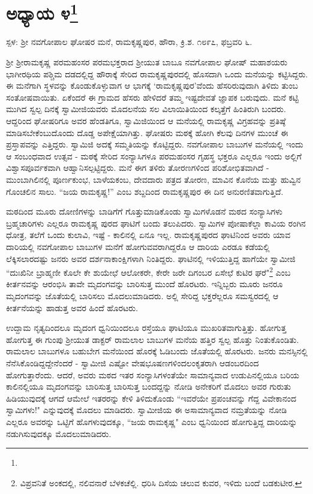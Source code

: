 \newpage

\chapter[ಅಧ್ಯಾಯ ೪]{ಅಧ್ಯಾಯ ೪\protect\footnote{}}

\begin{center}
ಸ್ಪಳ: ಶ‍್ರೀ ನವಗೋಪಾಲ ಘೋಷರ ಮನೆ, ರಾಮಕೃಷ್ಣಪುರ, ಹೌರಾ, ಕ್ರಿ.ಶ. ೧೮೯೭, ಫಬ್ರವರಿ ೬.
\end{center}

ಶ‍್ರೀ ಶ‍್ರೀರಾಮಕೃಷ್ಣ ಪರಮಹಂಸರ ಪರಮಭಕ್ತರಾದ ಶ‍್ರೀಯುತ ಬಾಬೂ ನವಗೋಪಾಲ ಘೋಷ್ ಮಹಾಶಯರು ಭಾಗೀರಥಿಯ ಪಶ್ಚಿಮ ದಡದಲ್ಲಿದ್ದ ಹೌರಾಕ್ಕೆ ಸೇರಿದ ರಾಮಕೃಷ್ಣಪುರದಲ್ಲಿ ಹೊಸದಾಗಿ ಒಂದು ಮನೆಯನ್ನು ಕಟ್ಟಿಸಿದ್ದರು. ಈ ಮನೆಗಾಗಿ ಸ್ಥಳವನ್ನು ಕೊಂಡುಕೊಳ್ಳುವಾಗ ಆ ಭಾಗಕ್ಕೆ ‘ರಾಮಕೃಷ್ಣಪುರ’ವೆಂದು ಹೆಸರಿರುವುದಾಗಿ ತಿಳಿದು ತುಂಬ ಸಂತೋಷವಾಯಿತು. ಏಕೆಂದರೆ ಈ ಗ್ರಾಮದ ಹೆಸರು ಹೇಳಿದರೆ ತಮ್ಮ ಇಷ್ಟದೇವತೆ ಜ್ಞಾಪಕ ಬರುವುದು. ಮನೆ ಕಟ್ಟಿ ಮುಗಿದ ಸ್ವಲ್ಪ ದಿನಕ್ಕೆ ಸ್ವಾಮೀಜಿಯವರು ಮೊದಲನೆಯ ಸಲ ವಿಲಾಯಿತಿಯಿಂದ ಕಲ್ಕತ್ತೆಗೆ ಹಿಂತಿರುಗಿ ಬಂದರು. ಆದ್ದರಿಂದ ಘೋಷರಿಗೂ ಅವರ ಹೆಂಡತಿಗೂ, ಸ್ವಾಮಿಜಿಯಿಂದ ಆ ಮನೆಯಲ್ಲಿ ರಾಮಕೃಷ್ಣ ವಿಗ್ರಹವನ್ನು ಪ್ರತಿಷ್ಠೆ ಮಾಡಿಸಬೇಕೆಂಬುದೊಂದು ದೊಡ್ಡ ಅಪೇಕ್ಷೆಯಾಗಿತ್ತು. ಘೋಷರು ಮಠಕ್ಕೆ ಹೋಗಿ ಕೆಲವು ದಿನಗಳ ಮುಂಚೆ ಈ ಪ್ರಸ್ತಾಪವನ್ನು ಎತ್ತಿದ್ದರು. ಸ್ವಾಮಿಜಿ ಅದಕ್ಕೆ ಸಮ್ಮತಿಯನ್ನು ಕೊಟ್ಟಿದ್ದರು. ನವಗೋಪಾಲ ಬಾಬುಗಳ ಮನೆಯಲ್ಲಿ ಇಂದು ಆ ಸಂಬಂಧವಾದ ಉತ್ಸವ - ಮಠಕ್ಕೆ ಸೇರಿದ ಸಂನ್ಯಾಸಿಗಳೂ ಪರಮಹಂಸರ ಗೃಹಸ್ಥ ಭಕ್ತರೂ ಎಲ್ಲರೂ ಇಂದು ಅಲ್ಲಿಗೆ ವಿಶ್ವಾಸಪೂರ್ವಕವಾಗಿ ಆಹ್ವಾನಿಸಲ್ಪಟ್ಟಿದ್ದರು. ಮನೆ ಈಗ ತಳಿರು ತೋರಣಗಳಿಂದ ಪರಿಶೋಭಿತವಾಗಿದೆ - ಮುಂಬಾಗಿಲಿನಲ್ಲಿ ಪೂರ್ಣಕುಂಭ, ಬಾಳೆಯಕಂಬ, ದೇವದಾರು ಪತ್ರದ ತೋರಣ, ಮಾವಿನ ಕೊನೆಯ ಮತ್ತು ಹುವ್ವಿನ ಗೊಂಚಲಿನ ಸಾಲು. “ಜಯ ರಾಮಕೃಷ್ಣ!” ಎಂಬ ಶಬ್ದದಿಂದ ರಾಮಕೃಷ್ಣಪುರ ಈ ದಿನ ಅನುರಣಿತವಾಗುತ್ತಿದೆ.

ಮಠದಿಂದ ಮೂರು ದೋಣಿಗಳನ್ನು ಬಾಡಿಗೆಗೆ ಗೊತ್ತುಮಾಡಿಕೊಂಡು ಸ್ವಾಮಿಗಳೊಡನೆ ಮಠದ ಸಂನ್ಯಾಸಿಗಳು ಬ್ರಹ್ಮಚಾರಿಗಳು ಎಲ್ಲರೂ ರಾಮಕೃಷ್ಣ ಪುರದ ಘಾಟಿಗೆ ಬಂದು ತಲುಪಿದರು. ಸ್ವಾಮಿಗಳ ಪೋಷಾಕೆಲ್ಲಾ ಕಾವಿಯ ರಂಗಿನ ಧೋತ್ರ, ತಲೆಗೆ ಒಂದು ಕುಲಾವಿ, ಇಷ್ಟೆ - ಕಾಲಿನಲ್ಲಿ ಏನೂ ಇಲ್ಲ. ರಾಮಕೃಷ್ಣಪುರದ ಘಾಟಿನಿಂದ ಅವರು ಯಾವ ದಾರಿಯಲ್ಲಿ ನವಗೋಪಾಲ ಬಾಬುಗಳ ಮನೆಗೆ ಹೋಗುವವರಾಗಿದ್ದರೊ ಆ ದಾರಿಯ ಎರಡೂ ಕಡೆಯಲ್ಲಿ ಲೆಕ್ಕಿಸಲಾರದಷ್ಟು ಜನರು ಅವರ ದರ್ಶನಾಕಾಂಕ್ಷಿಗಳಾಗಿ ನಿಂತಿದ್ದರು. ಘಾಟಿನಲ್ಲಿ ಇಳಿಯುತ್ತಿದ್ದ ಹಾಗೆಯೇ ಸ್ವಾಮೀಜಿ “ದುಃಖಿನೀ ಬ್ರಾಹ್ಮಣೀ ಕೊಲೇ ಕೇ ಶುಯೇಛೆ ಆಲೋಕರೇ, ಕೇರೇ ಜರೇ ದಿಗಂಬರ ಏಸೇಛೆ ಕುಟಿರ ಘರೆ"\footnote{ವಿಪ್ರವನಿತೆ ಅಂಕದಲ್ಲಿ, ನಲಿವನಾರೆ ಬೆಳಕಚೆಲ್ಲಿ. ಧರಿಸಿ ದಿಸೆಯ ಚಲುವ ಕುವರ, ಇಳಿದು ಬಂದೆ ಬಡಕುಟೀರ.} ಎಂಬ ಕೀರ್ತನವನ್ನು ಆರಂಭಿಸಿ ತಾವೇ ಮೃದಂಗವನ್ನು ಬಾರಿಸುತ್ತ ಮುಂದೆ ಹೊರಟರು. ಇನ್ನಿಬ್ಬರು ಮೂರು ಜನರೂ ಮೃದಂಗವನ್ನು ಜೊತೆಯಲ್ಲಿ ಬಾರಿಸಲು ಮೊದಲುಮಾಡಿದರು. ಅಲ್ಲಿ ಸೇರಿದ್ದ ಭಕ್ತರೆಲ್ಲರೂ ಸಮಸ್ವರದಲ್ಲಿ ಆ ಕೀರ್ತನೆಯನ್ನು ಹಾಡುತ್ತ ಅವರ ಹಿಂದೆ ಹೊರಟರು.

ಉದ್ದಾಮ ನೃತ್ಯದಿಂದಲೂ ಮೃದಂಗ ಧ್ವನಿಯಿಂದಲೂ ರಸ್ತೆಯೂ ಘಾಟಿಯೂ ಮುಖರಿತವಾಗುತ್ತಿತ್ತು. ಹೋಗುತ್ತ ಹೋಗುತ್ತ ಈ ಗುಂಪು ಶ‍್ರೀಯುತ ಡಾಕ್ಟರ್ ರಾಮಲಾಲ ಬಾಬುಗಳ ಮನೆಯ ಹತ್ತಿರ ಸ್ವಲ್ಪ ಹೊತ್ತು ನಿಂತುಕೊಂಡಿತು. ರಾಮಲಾಲ ಬಾಬುಗಳೂ ಬಹುಬೇಗ ಮನೆಯಿಂದ ಹೊರಕ್ಕೆ ಓಡಿಬಂದು ಜೊತೆಯಲ್ಲಿ ಹೊರಟರು. ಜನರು ಮನಸ್ಸಿನಲ್ಲಿ ನೆನೆಸಿಕೊಂಡಿದ್ದದ್ದೇನೆಂದರೆ - ಸ್ವಾಮೀಜಿ ಎಷ್ಟೋ ವೇಷಭೂಷಣಗಳಿಂದಲಂಕೃತರಾಗಿ ಆಡಂಬರದಿಂದ ಹೋಗುತ್ತಾರೆಂದು. ಆದರೆ, ಅವರು ಮಠದ ಇತರ ಸಂನ್ಯಾಸಿಗಳಂತೆಯೇ ಸಾಮಾನ್ಯವಾದ ಉಡುಪಿನಲ್ಲಿಯೂ ಬರಿಯ ಕಾಲಿನಲ್ಲಿಯೂ ಮೃದಂಗವನ್ನು ಬಾರಿಸುತ್ತ ಬಾರಿಸುತ್ತ ಬಂದದ್ದನ್ನು ನೋಡಿ ಅನೇಕರಿಗೆ ಮೊದಲು ಅವರ ಗುರುತು ಹಿಡಿಯುವುದಕ್ಕೆ ಆಗದೆ ಆಮೇಲೆ ಇತರರನ್ನು ಕೇಳಿ ತಿಳಿದುಕೊಂಡು “ಇವರೆಯೇ ಪ್ರಪಂಚವನ್ನು ಗೆದ್ದ ವಿವೇಕಾನಂದ ಸ್ವಾಮಿಗಳು!" ಎನ್ನುವುದಕ್ಕೆ ಮೊದಲು ಮಾಡಿದರು. ಸ್ವಾಮೀಜಿಯ ಈ ಅಸಾಮಾನ್ಯವಾದ ನಮ್ರತೆಯನ್ನು ನೋಡಿ ಎಲ್ಲರೂ ಅವರನ್ನು ಒಟ್ಟಿಗೆ ಹೊಗಳುವುದಕ್ಕೂ, “ಜಯ ರಾಮಕೃಷ್ಣ" ಎಂಬ ಧ್ವನಿಯಿಂದ ಹೋಗುತ್ತಿದ್ದ ದಾರಿಯನ್ನು ನಡುಗಿಸುವುದಕ್ಕೂ ಮೊದಲುಮಾಡಿದರು.

